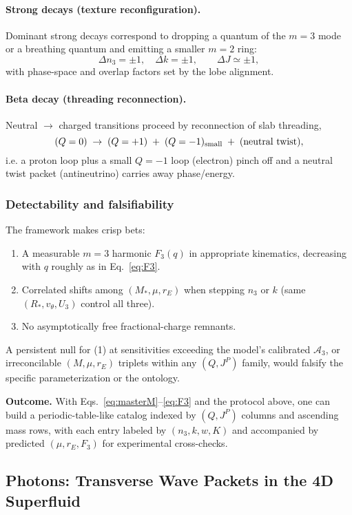 \paragraph{Strong decays (texture reconfiguration).}
Dominant strong decays correspond to dropping a quantum of the $m{=}3$ mode or a breathing quantum and emitting a smaller $m{=}2$ ring:
\[
\Delta n_3=\pm1,\quad \Delta k=\pm1,\qquad \Delta J\simeq \pm1,
\]
with phase-space and overlap factors set by the lobe alignment.

\paragraph{Beta decay (threading reconnection).}
Neutral $\to$ charged transitions proceed by reconnection of slab threading,
\[
(Q=0)\;\to\; (Q=+1)\;+\;(Q=-1)_{\rm small}\;+\;(\text{neutral twist}),
\]
i.e. a proton loop plus a small $Q=-1$ loop (electron) pinch off and a neutral twist packet (antineutrino) carries away phase/energy.

\subsubsection{Detectability and falsifiability}
\label{sec:baryons-phenomenology:tests}

The framework makes crisp bets:
\begin{enumerate}\setlength\itemsep{2pt}
\item A measurable $m{=}3$ harmonic $F_3(q)$ in appropriate kinematics, decreasing with $q$ roughly as in Eq.~\eqref{eq:F3}.
\item Correlated shifts among $(M_\ast,\mu,r_E)$ when stepping $n_3$ or $k$ (same $(R_\ast, v_\theta, U_3)$ control all three).
\item No asymptotically free fractional-charge remnants.
\end{enumerate}
A persistent null for (1) at sensitivities exceeding the model’s calibrated $\mathcal A_3$, or irreconcilable $(M,\mu,r_E)$ triplets within any $(Q,J^P)$ family, would falsify the specific parameterization or the ontology.

\medskip
\noindent\textbf{Outcome.}
With Eqs.~\eqref{eq:masterM}–\eqref{eq:F3} and the protocol above, one can build a periodic-table-like catalog indexed by $(Q,J^P)$ columns and ascending mass rows, with each entry labeled by $(n_3,k,w,K)$ and accompanied by predicted $(\mu,r_E,F_3)$ for experimental cross-checks.


\subsection{Photons: Transverse Wave Packets in the 4D Superfluid}

